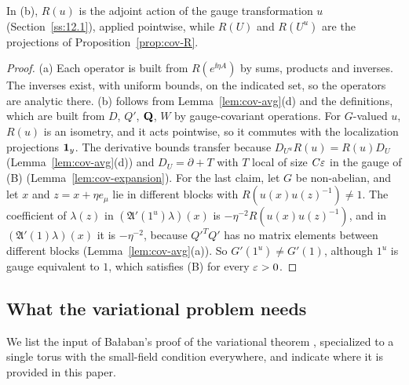 In (b), $R(u)$ is the adjoint action of the gauge transformation $u$ (Section~\ref{ss:12.1}), applied pointwise, while $R(U)$ and $R(U^u)$ are the projections of Proposition~\ref{prop:cov-R}.

\begin{proof}
(a) Each operator is built from $R(e^{\ii\eta A})$ by sums, products and inverses. The inverses exist, with uniform bounds, on the indicated set, so the operators are analytic there. (b) follows from Lemma~\ref{lem:cov-avg}(d) and the definitions, which are built from $D$, $Q'$, $\mathbf Q$, $W$ by gauge-covariant operations. For $G$-valued $u$, $R(u)$ is an isometry, and it acts pointwise, so it commutes with the localization projections $\mathbf 1_y$. The derivative bounds transfer because $D_{U^u}R(u)=R(u)D_U$ (Lemma~\ref{lem:cov-avg}(d)) and $D_U=\partial+T$ with $T$ local of size $C\varepsilon$ in the gauge of (B) (Lemma~\ref{lem:cov-expansion}). For the last claim, let $G$ be non-abelian, and let $x$ and $z=x+\eta e_\mu$ lie in different blocks with $R(u(x)u(z)^{-1})\ne1$. The coefficient of $\lambda(z)$ in $(\mathfrak A'(1^u)\lambda)(x)$ is $-\eta^{-2}R(u(x)u(z)^{-1})$, and in $(\mathfrak A'(1)\lambda)(x)$ it is $-\eta^{-2}$, because $Q'^TQ'$ has no matrix elements between different blocks (Lemma~\ref{lem:cov-avg}(a)). So $G'(1^u)\ne G'(1)$, although $1^u$ is gauge equivalent to $1$, which satisfies (B) for every $\varepsilon>0$.
\end{proof}

\subsection{What the variational problem needs}\label{subsec:checklist}

We list the input of Ba\l aban's proof of the variational theorem \cite{BalVar}, specialized to a single torus with the small-field condition everywhere, and indicate where it is provided in this paper.

